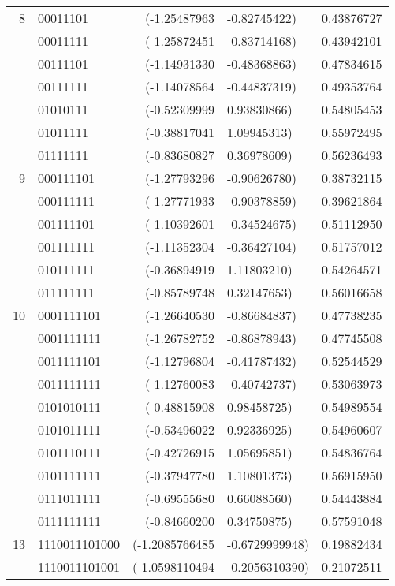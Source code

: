 \begin{table}
{\begin{center}
\begin{tabular}{rlr@{~,~}lr}
 8 & 00011101 &        (-1.25487963&-0.82745422)   &    0.43876727     \\
   & 00011111 &        (-1.25872451&-0.83714168)   &   0.43942101      \\
   & 00111101 &        (-1.14931330&-0.48368863)   &    0.47834615     \\
   & 00111111 &        (-1.14078564&-0.44837319)   &    0.49353764     \\
   & 01010111 &        (-0.52309999&0.93830866)   &    0.54805453     \\
   & 01011111 &        (-0.38817041&1.09945313)   &    0.55972495     \\
   & 01111111 &        (-0.83680827&0.36978609)   &    0.56236493    \\
 9 & 000111101  &        (-1.27793296&-0.90626780)  &     0.38732115    \\
   & 000111111  &        (-1.27771933&-0.90378859)  &     0.39621864   \\
   & 001111101  &        (-1.10392601&-0.34524675)  &     0.51112950     \\
   & 001111111  &        (-1.11352304&-0.36427104)  &     0.51757012    \\
   & 010111111  &        (-0.36894919&1.11803210)  &     0.54264571    \\
   & 011111111  &        (-0.85789748&0.32147653)  &     0.56016658    \\
 10 & 0001111101 &       (-1.26640530&-0.86684837)   &    0.47738235     \\
    & 0001111111 &       (-1.26782752&-0.86878943)   &    0.47745508      \\
    & 0011111101 &        (-1.12796804&-0.41787432)   &    0.52544529      \\
    & 0011111111 &        (-1.12760083&-0.40742737)   &    0.53063973     \\
    & 0101010111 &        (-0.48815908&0.98458725)   &    0.54989554      \\
    & 0101011111 &        (-0.53496022&0.92336925)   &    0.54960607      \\
    & 0101110111 &        (-0.42726915&1.05695851)   &    0.54836764      \\
    & 0101111111 &        (-0.37947780&1.10801373)  &     0.56915950   \\
    & 0111011111 &        (-0.69555680&0.66088560)   &    0.54443884   \\
    & 0111111111 &        (-0.84660200&0.34750875)   &    0.57591048   \\
13  & 1110011101000   &  (-1.2085766485&-0.6729999948)  &  0.19882434  \\
    & 1110011101001   &  (-1.0598110494&-0.2056310390)  &  0.21072511  \\
   \hline
\end{tabular}
\end{center}
}
\renewcommand{\arraystretch}{1.0}
\label{t-biham2}
\end{table}

